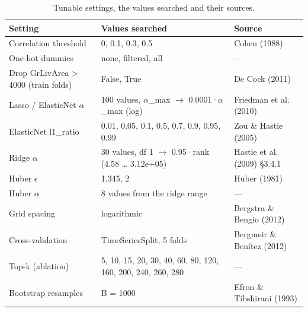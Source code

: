 \begin{table}[t]
\centering
\small
\begin{tabular}{lll}
\toprule
Setting & Values searched & Source \\
\midrule
Correlation threshold & 0, 0.1, 0.3, 0.5 & Cohen (1988) \\
One-hot dummies & none, filtered, all & — \\
Drop GrLivArea > 4000 (train folds) & False, True & De Cock (2011) \\
Lasso / ElasticNet $\alpha$ & 100 values, $\alpha$\_max $\rightarrow$ 0.0001·$\alpha$\_max (log) & Friedman et al. (2010) \\
ElasticNet l1\_ratio & 0.01, 0.05, 0.1, 0.5, 0.7, 0.9, 0.95, 0.99 & Zou \& Hastie (2005) \\
Ridge $\alpha$ & 30 values, df 1 $\rightarrow$ 0.95·rank (4.58 … 3.12e+05) & Hastie et al. (2009) §3.4.1 \\
Huber $\epsilon$ & 1.345, 2 & Huber (1981) \\
Huber $\alpha$ & 8 values from the ridge range & — \\
Grid spacing & logarithmic & Bergstra \& Bengio (2012) \\
Cross-validation & TimeSeriesSplit, 5 folds & Bergmeir \& Benítez (2012) \\
Top-k (ablation) & 5, 10, 15, 20, 30, 40, 60, 80, 120, 160, 200, 240, 260, 280 & — \\
Bootstrap resamples & B = 1000 & Efron \& Tibshirani (1993) \\
\bottomrule
\end{tabular}
\caption{Tunable settings, the values searched and their sources.}
\label{tab:settings}
\end{table}
